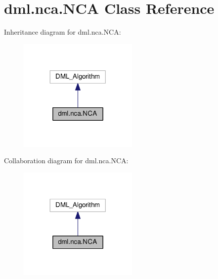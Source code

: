 \hypertarget{classdml_1_1nca_1_1NCA}{}\section{dml.\+nca.\+N\+CA Class Reference}
\label{classdml_1_1nca_1_1NCA}


Inheritance diagram for dml.\+nca.\+N\+CA\+:
\nopagebreak
\begin{figure}[H]
\begin{center}
\leavevmode
\includegraphics[width=164pt]{classdml_1_1nca_1_1NCA__inherit__graph}
\end{center}
\end{figure}


Collaboration diagram for dml.\+nca.\+N\+CA\+:
\nopagebreak
\begin{figure}[H]
\begin{center}
\leavevmode
\includegraphics[width=164pt]{classdml_1_1nca_1_1NCA__coll__graph}
\end{center}
\end{figure}
